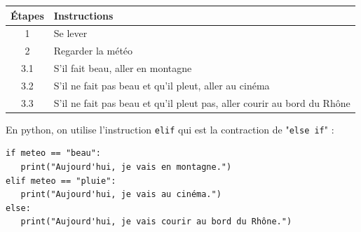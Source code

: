 \begin{tabular}{ c  l  }
	Étapes & Instructions \\ \hline
	1 & Se lever  \\ 
	2 & Regarder la météo  \\
	3.1 & S'il fait beau, aller en montagne  \\
	3.2 & S'il ne fait pas beau et qu'il pleut, aller au cinéma  \\
	3.3 & S'il ne fait pas beau et qu'il pleut pas, aller courir au bord du Rhône \\
\end{tabular}


En python, on utilise l'instruction \lstinline{elif} qui est la contraction de "\lstinline{else if}" :

\begin{lstlisting}[numbers=none]
if meteo == "beau":
   print("Aujourd'hui, je vais en montagne.")
elif meteo == "pluie":
   print("Aujourd'hui, je vais au cinéma.")
else:
   print("Aujourd'hui, je vais courir au bord du Rhône.")
\end{lstlisting}
